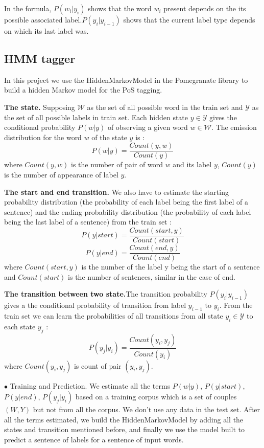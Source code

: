 \documentclass{article}
\def\WW{{\mathcal{W}}}
\def\YY{{\mathcal{Y}}}
\begin{document}
In the formula, $P(w_i|y_i)$ shows that the word $w_i$ present depends on the its possible associated label.$P(y_i|y_{i-1})$ shows that the current label type depends on which its last label was.

\subsection{HMM tagger}
In this project we use the HiddenMarkovModel in the Pomegranate library to build a hidden Markov model for the PoS tagging.

\textbf{The state.} Supposing $\WW$ as the set of all possible word in the train set and $\YY$ as the set of all possible labels in train set. Each hidden state $y \in \YY$ gives the conditional probability $P(w|y)$ of observing a given word $w \in \WW$. The emission distribution for the word $w$ of the state $y$ is : $$P(w|y) = \frac{Count(y,w)}{Count(y)}$$ where $Count(y,w)$ is the number of pair of word $w$ and its label $y$, $Count(y)$ is the number of appearance of label $y$.

\textbf{The start and end transition.} We also have to estimate the starting probability distribution (the probability of each label being the first label of a sentence) and the ending probability distribution (the probability of each label being the last label of a sentence) from the train set : $$P(y|start) = \frac{Count(start, y)}{Count(start)}$$ 
$$P(y|end) = \frac{Count(end, y)}{Count(end)}$$ where $Count(start, y)$ is the number of the label y being the start of a sentence and $Count(start)$ is the number of sentences, similar in the case of end.

\textbf{The transition between two state.}The transition probability $P(y_i|y_{i-1})$ gives a the conditional probability of transition from label $y_{i-1}$ to $y_i$. From the train set we can learn the probabilities of all transitions from all state $y_i \in \YY$ to each state $y_j$ :
$$P(y_j|y_i) = \frac{Count(y_i, y_j)}{Count(y_i)}$$ where $Count(y_i, y_j)$ is count of pair $(y_i, y_j)$.

$\bullet$ Training and Prediction. We estimate all the terms $P(w|y)$, $P(y|start)$, $P(y|end)$, $P(y_j|y_i)$ based on a training corpus which is a set of couples $(W, Y)$ but not from all the corpus. We don't use any data in the test set. After all the terms estimated, we build the HiddenMarkovModel by adding all the states and transition mentioned before, and finally we use the model built to predict a sentence of labels for a sentence of input words.
\end{document}
